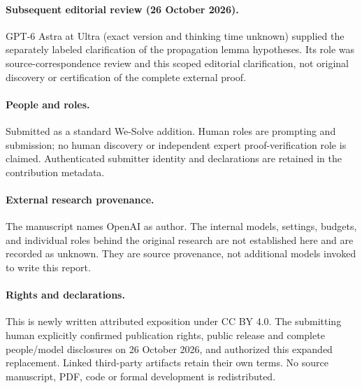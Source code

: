\documentclass[11pt,a4paper]{article}
\numberwithin{equation}{section}
\theoremstyle{definition}
\theoremstyle{remark}
\begin{document}
\paragraph{Subsequent editorial review (26 October 2026).} GPT-6 Astra at Ultra (exact version and thinking time unknown) supplied the separately labeled clarification of the propagation lemma hypotheses. Its role was source-correspondence review and this scoped editorial clarification, not original discovery or certification of the complete external proof.
\paragraph{People and roles.} Submitted as a standard We-Solve addition. Human roles are prompting and submission; no human discovery or independent expert proof-verification role is claimed. Authenticated submitter identity and declarations are retained in the contribution metadata.
\paragraph{External research provenance.} The manuscript names OpenAI as author.
The internal models, settings, budgets, and individual roles behind the original
research are not established here and are recorded as unknown. They are source
provenance, not additional models invoked to write this report.
\paragraph{Rights and declarations.} This is newly written attributed exposition under CC BY 4.0. The submitting human explicitly confirmed publication rights, public release and complete people/model disclosures on 26 October 2026, and authorized this expanded replacement. Linked third-party artifacts retain their own terms. No source manuscript, PDF, code or formal development is redistributed.
\end{document}
